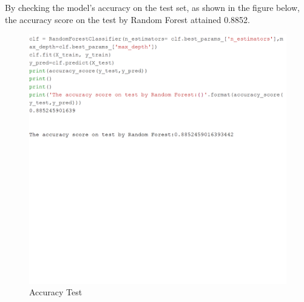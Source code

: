 \documentclass[sigconf]{acmart}
\begin{document}
By checking the model's accuracy on the test set, as shown in the figure below, the accuracy score on the test by Random Forest attained 0.8852.
\begin{figure}
    \centering
    \includegraphics[width=1.0\columnwidth]{project/images/Untitled7.png}
    \caption{Accuracy Test}
    \label{Accuracy}
\end{figure}
\end{document}
